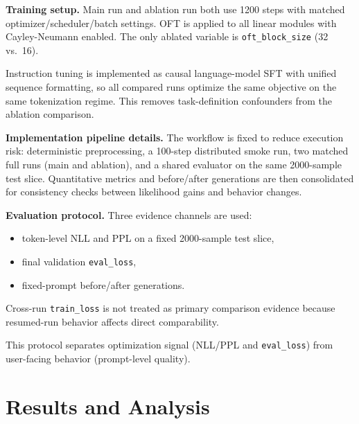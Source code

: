 \documentclass{article}
\begin{document}
\textbf{Training setup.} Main run and ablation run both use 1200 steps with matched optimizer/scheduler/batch settings. OFT is applied to all linear modules with Cayley-Neumann enabled. The only ablated variable is \texttt{oft\_block\_size} (32 vs.\ 16).

Instruction tuning is implemented as causal language-model SFT with unified sequence formatting, so all compared runs optimize the same objective on the same tokenization regime. This removes task-definition confounders from the ablation comparison.

\textbf{Implementation pipeline details.} The workflow is fixed to reduce execution risk: deterministic preprocessing, a 100-step distributed smoke run, two matched full runs (main and ablation), and a shared evaluator on the same 2000-sample test slice. Quantitative metrics and before/after generations are then consolidated for consistency checks between likelihood gains and behavior changes.

\textbf{Evaluation protocol.} Three evidence channels are used:
\begin{itemize}[leftmargin=*]
  \item token-level NLL and PPL on a fixed 2000-sample test slice,
  \item final validation \texttt{eval\_loss},
  \item fixed-prompt before/after generations.
\end{itemize}
Cross-run \texttt{train\_loss} is not treated as primary comparison evidence because resumed-run behavior affects direct comparability.

This protocol separates optimization signal (NLL/PPL and \texttt{eval\_loss}) from user-facing behavior (prompt-level quality).

\section{Results and Analysis}
\begin{table}[t]
  \centering
  \caption{Primary quantitative results on 2000 held-out samples (lower is better). The table supports in-domain likelihood comparison, not out-of-domain generalization claims.}
  \label{tab:main_results}
\end{table}
\end{document}
